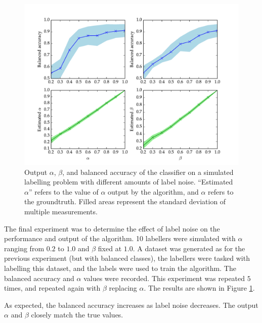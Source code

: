             \begin{figure}
                \centering
                \includegraphics[width=\textwidth]
                    {images/experiments/raykar_noise}
                \caption{Output $\alpha$, $\beta$, and balanced accuracy of the
                    \citeauthor{raykar10} classifier on a simulated labelling
                    problem with different amounts of label noise. ``Estimated
                    $\alpha$'' refers to the value of $\alpha$ output by the
                    algorithm, and $\alpha$ refers to the groundtruth. Filled
                    areas represent the standard deviation of multiple
                    measurements.}
                \label{fig:raykar-noise}
            \end{figure}

            The final experiment was to determine the effect of label noise on
            the performance and output of the algorithm. 10 labellers were
            simulated with $\alpha$ ranging from $0.2$ to $1.0$ and $\beta$
            fixed at $1.0$. A dataset was generated as for the previous
            experiment (but with balanced classes), the labellers were tasked
            with labelling this dataset, and the labels were used to train the
            algorithm. The balanced accuracy and $\alpha$ values were recorded.
            This experiment was repeated $5$ times, and repeated again with
            $\beta$ replacing $\alpha$. The results are shown in Figure
            \ref{fig:raykar-noise}.

            As expected, the balanced accuracy increases as label noise
            decreases. The output $\alpha$ and $\beta$ closely match the true
            values.

